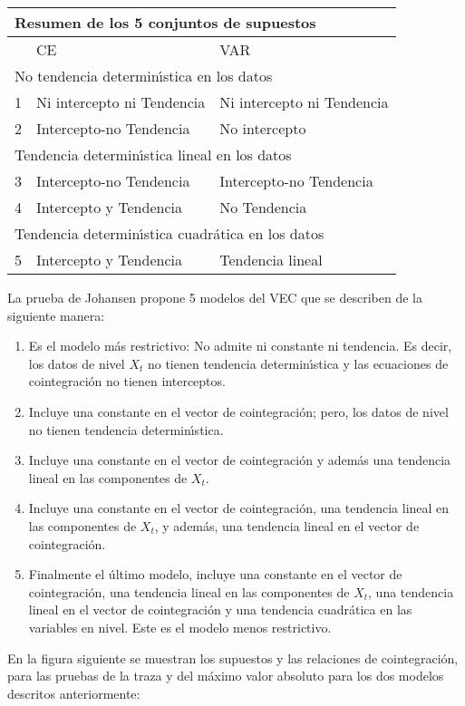 \begin{table}[H]
\begin{center}
\begin{tabular}{|p{13pt}|p{129pt}|p{129pt}|}
\hline
\multicolumn{3}{|p{271pt}|}{Resumen de los 5 conjuntos de supuestos} \\
\hline
& 
CE& 
VAR \\
\hline
\multicolumn{3}{|p{271pt}|}{No tendencia determin\'{\i}stica en los datos} \\
\hline
1& 
Ni intercepto ni Tendencia& 
Ni intercepto ni Tendencia \\
\hline
2& 
Intercepto-no Tendencia & 
No intercepto \\
\hline
\multicolumn{3}{|p{271pt}|}{Tendencia determin\'{\i}stica lineal en los datos} \\
\hline
3& 
Intercepto-no Tendencia & 
Intercepto-no Tendencia \\
\hline
4& 
Intercepto y Tendencia & 
No Tendencia \\
\hline
\multicolumn{3}{|p{271pt}|}{Tendencia determin\'{\i}stica cuadr\'{a}tica en los datos} \\
\hline
5& 
Intercepto y Tendencia & 
Tendencia lineal \\
\hline
\end{tabular}
\label{tab8}
\end{center}
\end{table}

La prueba de Johansen propone 5 modelos del VEC que se describen de la 
siguiente manera:

\begin{enumerate}
\item Es el modelo m\'{a}s restrictivo: No admite ni constante ni tendencia. Es decir, los datos de nivel $X_{t}$ no tienen tendencia determin\'{\i}stica y las ecuaciones de cointegraci\'{o}n no tienen interceptos.
\item Incluye una constante en el vector de cointegraci\'{o}n; pero, los datos de nivel no tienen tendencia determin\'{\i}stica.
\item Incluye una constante en el vector de cointegraci\'{o}n y adem\'{a}s una tendencia lineal en las componentes de $X_{t}$.
\item Incluye una constante en el vector de cointegraci\'{o}n, una tendencia lineal en las componentes de $X_{t}$, y adem\'{a}s, una tendencia lineal en el vector de cointegraci\'{o}n.
\item Finalmente el \'{u}ltimo modelo, incluye una constante en el vector de cointegraci\'{o}n, una tendencia lineal en las componentes de $X_{t}$, una tendencia lineal en el vector de cointegraci\'{o}n y una tendencia cuadr\'{a}tica en las variables en nivel. Este es el modelo menos restrictivo.
\end{enumerate}
En la figura siguiente se muestran los supuestos y las relaciones de 
cointegraci\'{o}n, para las pruebas de la traza y del m\'{a}ximo valor 
absoluto para los dos modelos descritos anteriormente:

